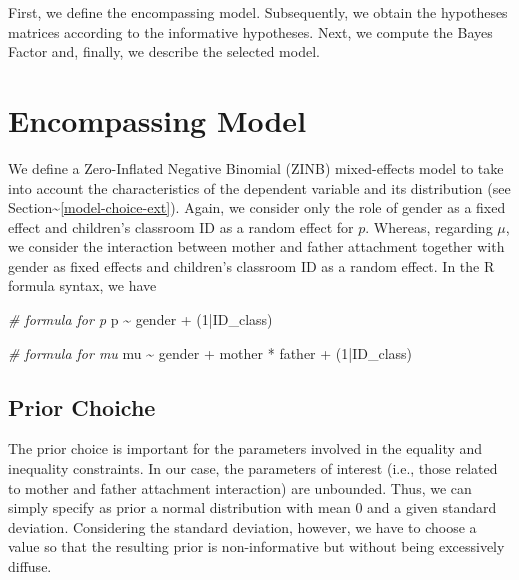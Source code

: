 \documentclass[
]{book}
\newenvironment{Shaded}{\begin{snugshade}}{\end{snugshade}}
\newcommand{\CommentTok}[1]{\textcolor[rgb]{0.56,0.35,0.01}{\textit{#1}}}
\newcommand{\DecValTok}[1]{\textcolor[rgb]{0.00,0.00,0.81}{#1}}
\newcommand{\NormalTok}[1]{#1}
\newcommand{\SpecialCharTok}[1]{\textcolor[rgb]{0.00,0.00,0.00}{#1}}
\begin{document}
First, we define the encompassing model. Subsequently, we obtain the hypotheses matrices according to the informative hypotheses. Next, we compute the Bayes Factor and, finally, we describe the selected model.

\hypertarget{encompassing-model}{%
\section{Encompassing Model}\label{encompassing-model}}

We define a Zero-Inflated Negative Binomial (ZINB) mixed-effects model to take into account the characteristics of the dependent variable and its distribution (see Section\textasciitilde\ref{model-choice-ext}). Again, we consider only the role of gender as a fixed effect and children's classroom ID as a random effect for \(p\). Whereas, regarding \(\mu\), we consider the interaction between mother and father attachment together with gender as fixed effects and children's classroom ID as a random effect. In the R formula syntax, we have

\begin{Shaded}
\begin{Highlighting}[]
\CommentTok{\# formula for p}
\NormalTok{p }\SpecialCharTok{\textasciitilde{}}\NormalTok{ gender }\SpecialCharTok{+}\NormalTok{ (}\DecValTok{1}\SpecialCharTok{|}\NormalTok{ID\_class)}

\CommentTok{\# formula for mu}
\NormalTok{mu }\SpecialCharTok{\textasciitilde{}}\NormalTok{ gender }\SpecialCharTok{+}\NormalTok{ mother }\SpecialCharTok{*}\NormalTok{ father }\SpecialCharTok{+}\NormalTok{ (}\DecValTok{1}\SpecialCharTok{|}\NormalTok{ID\_class)}
\end{Highlighting}
\end{Shaded}

\hypertarget{prior-choiche}{%
\subsection{Prior Choiche}\label{prior-choiche}}

The prior choice is important for the parameters involved in the equality and inequality constraints. In our case, the parameters of interest (i.e., those related to mother and father attachment interaction) are unbounded. Thus, we can simply specify as prior a normal distribution with mean 0 and a given standard deviation. Considering the standard deviation, however, we have to choose a value so that the resulting prior is non-informative but without being excessively diffuse.
\end{document}
